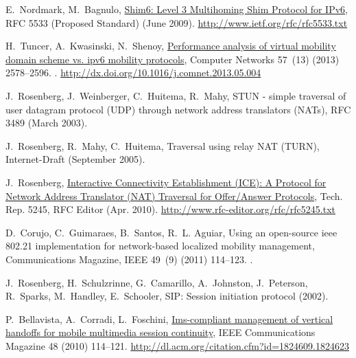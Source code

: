 \documentclass[preprint,12pt]{elsarticle}
\begin{document}
\begin{thebibliography}{10}
E.~Nordmark, M.~Bagnulo, \href{http://www.ietf.org/rfc/rfc5533.txt}{{Shim6:
  Level 3 Multihoming Shim Protocol for IPv6}}, RFC 5533 (Proposed Standard)
  (June 2009).
\newline\urlprefix\url{http://www.ietf.org/rfc/rfc5533.txt}

H.~Tuncer, A.~Kwasinski, N.~Shenoy,
  \href{http://dx.doi.org/10.1016/j.comnet.2013.05.004}{Performance analysis of
  virtual mobility domain scheme vs. ipv6 mobility protocols}, Computer
  Networks 57~(13) (2013) 2578--2596.
\newblock \href {http://dx.doi.org/10.1016/j.comnet.2013.05.004}
  {}.
\newline\urlprefix\url{http://dx.doi.org/10.1016/j.comnet.2013.05.004}

J.~Rosenberg, J.~Weinberger, C.~Huitema, R.~Mahy, {STUN} - simple traversal of
  user datagram protocol ({UDP}) through network address translators ({NATs}),
  RFC 3489 (March 2003).

J.~Rosenberg, R.~Mahy, C.~Huitema, Traversal using relay {NAT} ({TURN}),
  Internet-Draft (September 2005).

J.~Rosenberg, \href{http://www.rfc-editor.org/rfc/rfc5245.txt}{{Interactive
  Connectivity Establishment (ICE): A Protocol for Network Address Translator
  (NAT) Traversal for Offer/Answer Protocols}}, Tech. Rep. 5245, RFC Editor
  (Apr. 2010).
\newline\urlprefix\url{http://www.rfc-editor.org/rfc/rfc5245.txt}

D.~Corujo, C.~Guimaraes, B.~Santos, R.~L. Aguiar, Using an open-source ieee
  802.21 implementation for network-based localized mobility management,
  Communications Magazine, IEEE 49~(9) (2011) 114--123.
\newblock \href {http://dx.doi.org/10.1109/MCOM.2011.6011742}
  {}.

J.~Rosenberg, H.~Schulzrinne, G.~Camarillo, A.~Johnston, J.~Peterson,
  R.~Sparks, M.~Handley, E.~Schooler, {SIP}: Session initiation protocol
  (2002).

P.~Bellavista, A.~Corradi, L.~Foschini,
  \href{http://dl.acm.org/citation.cfm?id=1824609.1824623}{Ims-compliant
  management of vertical handoffs for mobile multimedia session continuity},
  IEEE Communications Magazine 48 (2010) 114--121.
\newline\urlprefix\url{http://dl.acm.org/citation.cfm?id=1824609.1824623}


\end{thebibliography}
\end{document}
